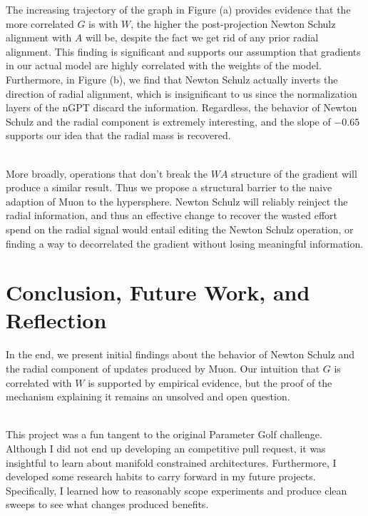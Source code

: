 \documentclass{article}
\begin{document}
The increasing trajectory of the graph in Figure (a) provides evidence that the more correlated $G$ is with $W$, the higher the post-projection Newton Schulz alignment with $A$ will be, despite the fact we get rid of any prior radial alignment. This finding is significant and supports our assumption that gradients in our actual model are highly correlated with the weights of the model. Furthermore, in Figure (b), we find that Newton Schulz actually inverts the direction of radial alignment, which is insignificant to us since the normalization layers of the nGPT discard the information. Regardless, the behavior of Newton Schulz and the radial component is extremely interesting, and the slope of $-0.65$ supports our idea that the radial mass is recovered.

\\

More broadly, operations that don't break the $WA$ structure of the gradient will produce a similar result. Thus we propose a structural barrier to the naive adaption of Muon to the hypersphere. Newton Schulz will reliably reinject the radial information, and thus an effective change to recover the wasted effort spend on the radial signal would entail editing the Newton Schulz operation, or finding a way to decorrelated the gradient without losing meaningful information.

\section{Conclusion, Future Work, and Reflection}

In the end, we present initial findings about the behavior of Newton Schulz and the radial component of updates produced by Muon. Our intuition that $G$ is correlated with $W$ is supported by empirical evidence, but the proof of the mechanism explaining it remains an unsolved and open question.

\\

This project was a fun tangent to the original Parameter Golf challenge. Although I did not end up developing an competitive pull request, it was insightful to learn about manifold constrained architectures. Furthermore, I developed some research habits to carry forward in my future projects. Specifically, I learned how to reasonably scope experiments and produce clean sweeps to see what changes produced benefits.

\\
\end{document}
